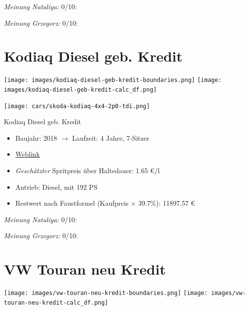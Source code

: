 \documentclass[landscape, DIV=99, 14pt]{scrartcl}
\begin{document}
\begin{small}
\emph{Meinung Nataliya:} 0/10: 
        
\emph{Meinung Grzegorz:} 0/10: 
\end{small}

\pagebreak


\twocolumn

\section*{Kodiaq Diesel geb. Kredit}
\begin{center}
\texttt{[image: images/kodiaq-diesel-geb-kredit-boundaries.png]}
\null
\vspace{0.5cm}
\texttt{[image: images/kodiaq-diesel-geb-kredit-calc\_df.png]}
\end{center}

\pagebreak
\begin{center}
\texttt{[image: cars/skoda-kodiaq-4x4-2p0-tdi.png]}

Kodiaq Diesel geb. Kredit
\end{center}

\begin{itemize}
    \item Baujahr: 2018 $\rightarrow$ Laufzeit: 4 Jahre, 7-Sitzer
    \item \href{https://suchen.mobile.de/fahrzeuge/details.html?action=parkItem&id=336544234}{Weblink}
    \item \emph{Gesch\"atzter} Spritpreis \"uber Haltedauer: 1.65 \euro{}/l
    \item Antrieb: Diesel, mit 192 PS
    \item Restwert nach Faustformel (Kaufpreis $\times$ 39.7\%): 11897.57 \euro{}
\end{itemize}

\begin{small}
\emph{Meinung Nataliya:} 0/10: 
        
\emph{Meinung Grzegorz:} 0/10: 
\end{small}

\pagebreak


\twocolumn

\section*{VW Touran neu Kredit}
\begin{center}
\texttt{[image: images/vw-touran-neu-kredit-boundaries.png]}
\null
\vspace{0.5cm}
\texttt{[image: images/vw-touran-neu-kredit-calc\_df.png]}
\end{center}
\end{document}
